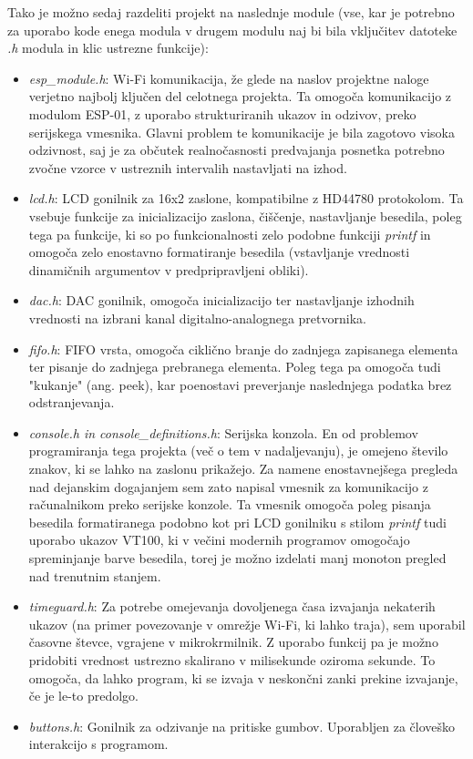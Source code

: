 \documentclass[12pt,a4paper,twoside,openright,slovene]{book}
\begin{document}
Tako je možno sedaj razdeliti projekt na naslednje module (vse, kar je potrebno za uporabo kode enega modula v drugem modulu naj bi bila vključitev datoteke \textit{.h} modula in klic ustrezne funkcije):
\begin{itemize}
\item \textit{esp\_module.h}: Wi-Fi komunikacija, že glede na naslov projektne naloge verjetno najbolj ključen del celotnega projekta. Ta omogoča komunikacijo z modulom ESP-01, z uporabo strukturiranih ukazov in odzivov, preko serijskega vmesnika. Glavni problem te komunikacije je bila zagotovo visoka odzivnost, saj je za občutek realnočasnosti predvajanja posnetka potrebno zvočne vzorce v ustreznih intervalih nastavljati na izhod.
\item \textit{lcd.h}: LCD gonilnik za 16x2 zaslone, kompatibilne z HD44780 protokolom. Ta vsebuje funkcije za inicializacijo zaslona, čiščenje, nastavljanje besedila, poleg tega pa funkcije, ki so po funkcionalnosti zelo podobne funkciji \textit{printf} in omogoča zelo enostavno formatiranje besedila (vstavljanje vrednosti dinamičnih argumentov v predpripravljeni obliki).
\item \textit{dac.h}: DAC gonilnik, omogoča inicializacijo ter nastavljanje izhodnih vrednosti na izbrani kanal digitalno-analognega pretvornika.
\item \textit{fifo.h}: FIFO vrsta, omogoča ciklično branje do zadnjega zapisanega elementa ter pisanje do zadnjega prebranega elementa. Poleg tega pa omogoča tudi "kukanje" (ang. peek), kar poenostavi preverjanje naslednjega podatka brez odstranjevanja.
\item \textit{console.h in console\_definitions.h}: Serijska konzola. En od problemov programiranja tega projekta (več o tem v nadaljevanju), je omejeno število znakov, ki se lahko na zaslonu prikažejo. Za namene enostavnejšega pregleda nad dejanskim dogajanjem sem zato napisal vmesnik za komunikacijo z računalnikom preko serijske konzole. Ta vmesnik omogoča poleg pisanja besedila formatiranega podobno kot pri LCD gonilniku s stilom \textit{printf} tudi uporabo ukazov VT100, ki v večini modernih programov omogočajo spreminjanje barve besedila, torej je možno izdelati manj monoton pregled nad trenutnim stanjem.
\item \textit{timeguard.h}: Za potrebe omejevanja dovoljenega časa izvajanja nekaterih ukazov (na primer povezovanje v omrežje Wi-Fi, ki lahko traja), sem uporabil časovne števce, vgrajene v mikrokrmilnik. Z uporabo funkcij pa je možno pridobiti vrednost ustrezno skalirano v milisekunde oziroma sekunde. To omogoča, da lahko program, ki se izvaja v neskončni zanki prekine izvajanje, če je le-to predolgo.
\item \textit{buttons.h}: Gonilnik za odzivanje na pritiske gumbov. Uporabljen za človeško interakcijo s programom.
\end{itemize}
\end{document}
